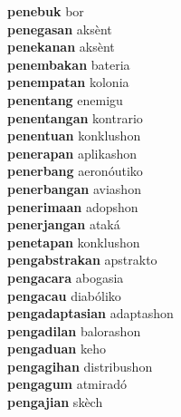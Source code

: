 \textbf{penebuk } bor \\
\textbf{penegasan } aksènt \\
\textbf{penekanan } aksènt \\
\textbf{penembakan } bateria \\
\textbf{penempatan } kolonia \\
\textbf{penentang } enemigu \\
\textbf{penentangan } kontrario \\
\textbf{penentuan } konklushon \\
\textbf{penerapan } aplikashon \\
\textbf{penerbang } aeronóutiko \\
\textbf{penerbangan } aviashon \\
\textbf{penerimaan } adopshon \\
\textbf{penerjangan } ataká \\
\textbf{penetapan } konklushon \\
\textbf{pengabstrakan } apstrakto \\
\textbf{pengacara } abogasia \\
\textbf{pengacau } diabóliko \\
\textbf{pengadaptasian } adaptashon \\
\textbf{pengadilan } balorashon \\
\textbf{pengaduan } keho \\
\textbf{pengagihan } distribushon \\
\textbf{pengagum } atmiradó \\
\textbf{pengajian } skèch \\
